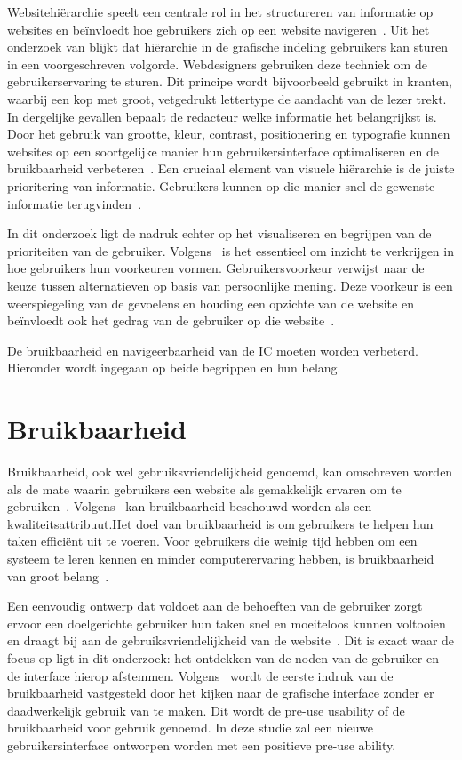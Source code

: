 Websitehiërarchie speelt een centrale rol in het structureren van informatie op websites en beïnvloedt hoe gebruikers zich op een website navigeren~\autocite{Djonov2007}. Uit het onderzoek van \textcite{Urano2021} blijkt dat hiërarchie in de grafische indeling gebruikers kan sturen in een voorgeschreven volgorde. Webdesigners gebruiken deze techniek om de gebruikerservaring te sturen. Dit principe wordt bijvoorbeeld gebruikt in kranten, waarbij een kop met groot, vetgedrukt lettertype de aandacht van de lezer trekt. In dergelijke gevallen bepaalt de redacteur welke informatie het belangrijkst is. Door het gebruik van grootte, kleur, contrast, positionering en typografie kunnen websites op een soortgelijke manier hun gebruikersinterface optimaliseren en de bruikbaarheid verbeteren~\autocite{Raghavendra2024}. Een cruciaal element van visuele hiërarchie is de juiste prioritering van informatie. Gebruikers kunnen op die manier snel de gewenste informatie terugvinden~\autocite{Raghavendra2024}.\smallskip\par In dit onderzoek ligt de nadruk echter op het visualiseren en begrijpen van de prioriteiten van de gebruiker. Volgens~\textcite{Lee2010} is het essentieel om inzicht te verkrijgen in hoe gebruikers hun voorkeuren vormen. Gebruikersvoorkeur verwijst naar de keuze tussen alternatieven op basis van persoonlijke mening. Deze voorkeur is een weerspiegeling van de gevoelens en houding een opzichte van de website en beïnvloedt ook het gedrag van de gebruiker op die website~\autocite{Lee2010}.\par
\bigskip
De bruikbaarheid en navigeerbaarheid van de IC moeten worden verbeterd. Hieronder wordt ingegaan op beide begrippen en hun belang.
\section{Bruikbaarheid}
Bruikbaarheid, ook wel gebruiksvriendelijkhe\-id genoemd, kan omschreven worden als de mate waarin gebruikers een website als gemakkelijk ervaren om te gebruiken~\autocite{Dianat2019}. Volgens~\textcite{Dingli2014} kan bruikbaarheid beschouwd worden als een kwaliteitsattribuut.Het doel van bruikbaarheid is om gebruikers te helpen hun taken efficiënt uit te voeren. Voor gebruikers die weinig tijd hebben om een systeem te leren kennen en minder computerervaring hebben, is bruikbaarheid van groot belang~\autocite{Mazumder2014}.\smallskip\par Een eenvoudig ontwerp dat voldoet aan de behoeften van de gebruiker zorgt ervoor een doelgerichte gebruiker hun taken snel en moeiteloos kunnen voltooien en draagt bij aan de gebruiksvriendelijkheid van de website~\autocite{Pearson2007}. Dit is exact waar de focus op ligt in dit onderzoek: het ontdekken van de noden van de gebruiker en de interface hierop afstemmen. Volgens~\textcite{Zachrison2022} wordt de eerste indruk van de bruikbaarheid vastgesteld door het kijken naar de grafische interface zonder er daadwerkelijk gebruik van te maken. Dit wordt de pre-use usability of de bruikbaarheid voor gebruik genoemd. In deze studie zal een nieuwe gebruikersinterface ontworpen worden met een positieve pre-use ability.

